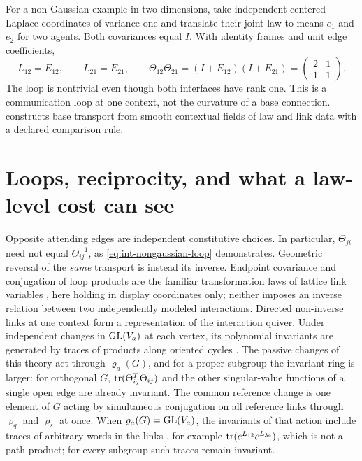 For a non-Gaussian example in two dimensions, take independent centered Laplace coordinates of variance one and translate their joint law to means $e_1$ and $e_2$ for two agents. Both covariances equal $I$. With identity frames and unit edge coefficients,
\begin{equation}
L_{12}=E_{12},\qquad L_{21}=E_{21},\qquad
\Theta_{12}\Theta_{21}
=(I+E_{12})(I+E_{21})
=\begin{pmatrix}2&1\\1&1\end{pmatrix}.
\label{eq:int-nongaussian-loop}
\end{equation}
The loop is nontrivial even though both interfaces have rank one. This is a communication loop at one context, not the curvature of a base connection.  constructs base transport from smooth contextual fields of law and link data with a declared comparison rule.

\section{Loops, reciprocity, and what a law-level cost can see}

Opposite attending edges are independent constitutive choices. In particular, $\Theta_{ji}$ need not equal $\Theta_{ij}^{-1}$, as \cref{eq:int-nongaussian-loop} demonstrates. Geometric reversal of the \emph{same} transport is instead its inverse. Endpoint covariance and conjugation of loop products are the familiar transformation laws of lattice link variables \citep{Wilson1974}, here holding in display coordinates only; neither imposes an inverse relation between two independently modeled interactions. Directed non-inverse links at one context form a representation of the interaction quiver. Under independent changes in $\mathrm{GL}(V_a)$ at each vertex, its polynomial invariants are generated by traces of products along oriented cycles \citep{LeBruynProcesi1990}. The passive changes of this theory act through $\varrho_a(G)$, and for a proper subgroup the invariant ring is larger: for orthogonal $G$, $\operatorname{tr}(\Theta_{ij}^T\Theta_{ij})$ and the other singular-value functions of a single open edge are already invariant. The common reference change is one element of $G$ acting by simultaneous conjugation on all reference links through $\varrho_q$ and $\varrho_s$ at once. When $\varrho_a(G)=\mathrm{GL}(V_a)$, the invariants of that action include traces of arbitrary words in the links \citep{Procesi1976}, for example $\operatorname{tr}(e^{L_{12}}e^{L_{34}})$, which is not a path product; for every subgroup such traces remain invariant.

